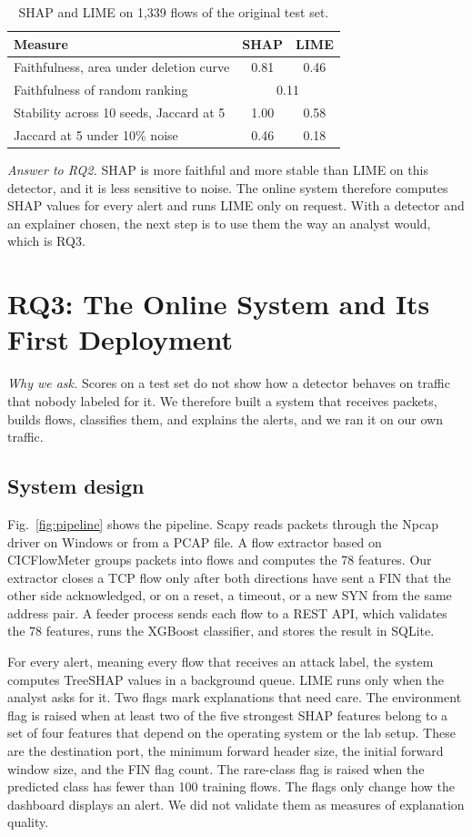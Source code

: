 \documentclass[conference]{IEEEtran}
\begin{document}
\begin{table}[t]
\caption{SHAP and LIME on 1,339 flows of the original test set.}
\label{tab:xai}
\centering
\small
\begin{tabular}{lcc}
\toprule
Measure & SHAP & LIME \\
\midrule
Faithfulness, area under deletion curve & 0.81 & 0.46 \\
Faithfulness of random ranking & \multicolumn{2}{c}{0.11} \\
Stability across 10 seeds, Jaccard at 5 & 1.00 & 0.58 \\
Jaccard at 5 under 10\% noise & 0.46 & 0.18 \\
\bottomrule
\end{tabular}
\end{table}

\textit{Answer to RQ2.} SHAP is more faithful and more stable than LIME on this detector, and it is less sensitive to noise. The online system therefore computes SHAP values for every alert and runs LIME only on request. With a detector and an explainer chosen, the next step is to use them the way an analyst would, which is RQ3.

\section{RQ3: The Online System and Its First Deployment}
\textit{Why we ask.} Scores on a test set do not show how a detector behaves on traffic that nobody labeled for it. We therefore built a system that receives packets, builds flows, classifies them, and explains the alerts, and we ran it on our own traffic.

\subsection{System design}
Fig.~\ref{fig:pipeline} shows the pipeline. Scapy reads packets through the Npcap driver on Windows or from a PCAP file. A flow extractor based on CICFlowMeter groups packets into flows and computes the 78 features. Our extractor closes a TCP flow only after both directions have sent a FIN that the other side acknowledged, or on a reset, a timeout, or a new SYN from the same address pair. A feeder process sends each flow to a REST API, which validates the 78 features, runs the XGBoost classifier, and stores the result in SQLite.

For every alert, meaning every flow that receives an attack label, the system computes TreeSHAP values in a background queue. LIME runs only when the analyst asks for it. Two flags mark explanations that need care. The environment flag is raised when at least two of the five strongest SHAP features belong to a set of four features that depend on the operating system or the lab setup. These are the destination port, the minimum forward header size, the initial forward window size, and the FIN flag count. The rare-class flag is raised when the predicted class has fewer than 100 training flows. The flags only change how the dashboard displays an alert. We did not validate them as measures of explanation quality.
\end{document}
